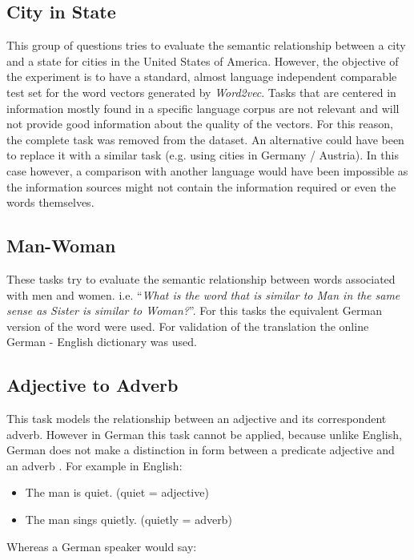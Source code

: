 \subsection{City in State}
\label{sec:sub_sec_city_in_state}
This group of questions tries to  evaluate the semantic relationship between a city
and a state for cities in the United States of America.  However, the
objective of the experiment is to have a standard,  almost
language independent comparable test set for the word vectors generated by
\textit{Word2vec}. Tasks that are centered in information mostly found in a
specific language corpus  are not relevant and
will not provide good information about the quality of the vectors. For this
reason, the complete task  was removed from the dataset. An alternative could
have been to replace it with a similar task (e.g. using cities in Germany / Austria). In this case however, a
comparison with another language would have been impossible as the
information sources might not contain the  information required or even the
words themselves.

\subsection{Man-Woman}
\label{sec:sub_sec_man_woman}
These tasks try to evaluate the semantic relationship between words associated
with men and women. i.e. ``\emph{What is the word that is similar to
Man in the same sense as Sister is similar to Woman?}''. For this tasks
the equivalent German version of the word were used. For validation of the
translation the online German - English
dictionary was used.

\subsection{Adjective to Adverb}
\label{sec:sub_sec_adjetive_adverb}
This task models the relationship between an adjective and its correspondent
adverb.   However in German this task cannot be applied,  because unlike English,
German does not make a distinction in form between a predicate adjective and
an adverb \cite{durrell2011hammer}. For example in English:

\begin{itemize}
\item The man is quiet. (quiet = adjective)
\item The man sings quietly. (quietly = adverb)
\end{itemize}

Whereas a German speaker would say:

